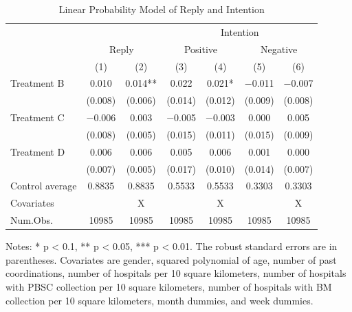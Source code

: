\documentclass[
]{article}
\begin{document}
\begin{table}

\caption{\label{tab:reg-stock}Linear Probability Model of Reply and Intention}
\centering
\fontsize{9}{11}\selectfont
\begin{threeparttable}
\begin{tabular}[t]{lcccccc}
\toprule
\multicolumn{3}{c}{ } & \multicolumn{4}{c}{Intention} \\
\cmidrule(l{3pt}r{3pt}){4-7}
\multicolumn{1}{c}{ } & \multicolumn{2}{c}{Reply} & \multicolumn{2}{c}{Positive} & \multicolumn{2}{c}{Negative} \\
\cmidrule(l{3pt}r{3pt}){2-3} \cmidrule(l{3pt}r{3pt}){4-5} \cmidrule(l{3pt}r{3pt}){6-7}
  & (1) & (2) & (3) & (4) & (5) & (6)\\
\midrule
Treatment B & \num{0.010} & \num{0.014}** & \num{0.022} & \num{0.021}* & \num{-0.011} & \num{-0.007}\\
 & (\num{0.008}) & (\num{0.006}) & (\num{0.014}) & (\num{0.012}) & (\num{0.009}) & (\num{0.008})\\
Treatment C & \num{-0.006} & \num{0.003} & \num{-0.005} & \num{-0.003} & \num{0.000} & \num{0.005}\\
 & (\num{0.008}) & (\num{0.005}) & (\num{0.015}) & (\num{0.011}) & (\num{0.015}) & (\num{0.009})\\
Treatment D & \num{0.006} & \num{0.006} & \num{0.005} & \num{0.006} & \num{0.001} & \num{0.000}\\
 & (\num{0.007}) & (\num{0.005}) & (\num{0.017}) & (\num{0.010}) & (\num{0.014}) & (\num{0.007})\\
\midrule
Control average & 0.8835 & 0.8835 & 0.5533 & 0.5533 & 0.3303 & 0.3303\\
Covariates &  & X &  & X &  & X\\
Num.Obs. & \num{10985} & \num{10985} & \num{10985} & \num{10985} & \num{10985} & \num{10985}\\
\bottomrule
\end{tabular}
\begin{tablenotes}
\item Notes: * p < 0.1, ** p < 0.05, *** p < 0.01. The robust standard errors are in parentheses. Covariates are gender, squared polynomial of age, number of past coordinations, number of hospitals per 10 square kilometers, number of hospitals with PBSC collection per 10 square kilometers, number of hospitals with BM collection per 10 square kilometers, month dummies, and week dummies.
\end{tablenotes}
\end{threeparttable}
\end{table}
\end{document}
